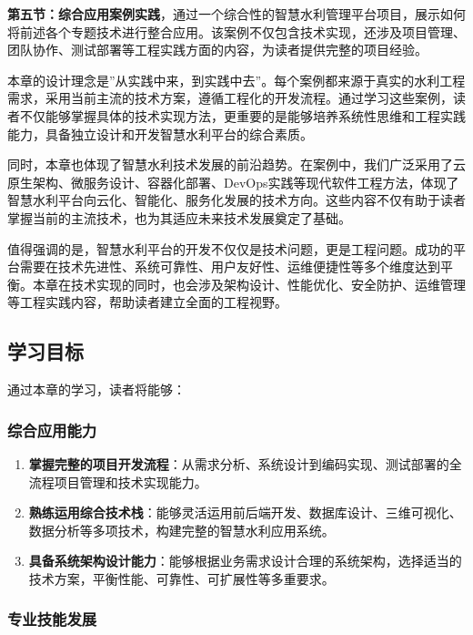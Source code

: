 \textbf{第五节：综合应用案例实践}，通过一个综合性的智慧水利管理平台项目，展示如何将前述各个专题技术进行整合应用。该案例不仅包含技术实现，还涉及项目管理、团队协作、测试部署等工程实践方面的内容，为读者提供完整的项目经验。

本章的设计理念是''从实践中来，到实践中去''。每个案例都来源于真实的水利工程需求，采用当前主流的技术方案，遵循工程化的开发流程。通过学习这些案例，读者不仅能够掌握具体的技术实现方法，更重要的是能够培养系统性思维和工程实践能力，具备独立设计和开发智慧水利平台的综合素质。

同时，本章也体现了智慧水利技术发展的前沿趋势。在案例中，我们广泛采用了云原生架构、微服务设计、容器化部署、DevOps实践等现代软件工程方法，体现了智慧水利平台向云化、智能化、服务化发展的技术方向。这些内容不仅有助于读者掌握当前的主流技术，也为其适应未来技术发展奠定了基础。

值得强调的是，智慧水利平台的开发不仅仅是技术问题，更是工程问题。成功的平台需要在技术先进性、系统可靠性、用户友好性、运维便捷性等多个维度达到平衡。本章在技术实现的同时，也会涉及架构设计、性能优化、安全防护、运维管理等工程实践内容，帮助读者建立全面的工程视野。

\subsection{学习目标}\label{ux5b66ux4e60ux76eeux6807}

通过本章的学习，读者将能够：

\subsubsection{综合应用能力}\label{ux7efcux5408ux5e94ux7528ux80fdux529b}

\begin{enumerate}
\def\labelenumi{\arabic{enumi}.}
\item
  \textbf{掌握完整的项目开发流程}：从需求分析、系统设计到编码实现、测试部署的全流程项目管理和技术实现能力。
\item
  \textbf{熟练运用综合技术栈}：能够灵活运用前后端开发、数据库设计、三维可视化、数据分析等多项技术，构建完整的智慧水利应用系统。
\item
  \textbf{具备系统架构设计能力}：能够根据业务需求设计合理的系统架构，选择适当的技术方案，平衡性能、可靠性、可扩展性等多重要求。
\end{enumerate}

\subsubsection{专业技能发展}\label{ux4e13ux4e1aux6280ux80fdux53d1ux5c55}

